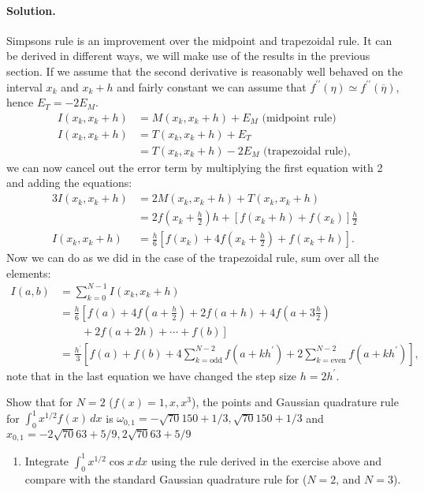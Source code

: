 \documentclass[graybox,sectrefs,envcountresetchap,open=right,final]{svmonodo}
\newenvironment{doconceexercise}{}{}
\begin{document}
\begin{doconceexercise}
\paragraph{Solution.}
Simpsons rule is an improvement over the midpoint and trapezoidal rule. It can be derived in different ways, we will make use of 
the results in the previous section. If we assume that the second derivative is reasonably well behaved on the interval $x_k$ 
and $x_k+h$ and fairly constant we can assume that $f^{\prime\prime}(\eta)\simeq f^{\prime\prime}(\overline{\eta})$, hence $E_T=-2E_M$.
\begin{align}
I(x_k,x_k+h)&=M(x_k,x_k+h)+E_M\text{ (midpoint rule)}\\ 
I(x_k,x_k+h)&=T(x_k,x_k+h)+E_T\nonumber\\ 
&=T(x_k,x_k+h)-2E_M\text{ (trapezoidal rule)},
\end{align}
we can now cancel out the error term by multiplying the first equation with 2 and adding the equations:
\begin{align}
3I(x_k,x_k+h)&=2M(x_k,x_k+h)+T(x_k,x_k+h)\\ 
&=2f(x_k+\frac{h}{2}) h+\left[f(x_k+h)+f(x_k)\right] \frac{h}{2}\\ 
I(x_k,x_k+h)&=\frac{h}{6}\left[f(x_k)+4f(x_k+\frac{h}{2})+f(x_k+h)\right].
\end{align}
Now we can do as we did in the case of the trapezoidal rule, sum over all the elements:
\begin{align}
I(a,b)&=\sum_{k=0}^{N-1}I(x_k,x_k+h)\nonumber\\ 
&=\frac{h}{6}\left[f(a)+ 4f(a+\frac{h}{2})+2f(a+h)+4f(a+3\frac{h}{2})\right.\nonumber\\ 
&\left.\qquad+2f(a+2h)+\cdots+f(b)\right]\\ 
&=\frac{h^\prime}{3}\left[f(a)+ f(b) + 4\sum_{k= \text{odd}}^{N-2}f(a+k h^\prime)+2\sum_{k= \text{even}}^{N-2}f(a+k h^\prime)\right],
\end{align}
note that in the last equation we have changed the step size $h=2h^\prime$.



Show that for $N=2$ ($f(x)=1,x,x^3$), the points and Gaussian quadrature rule for $\int_{0}^{1}x^{1/2}f(x)\,dx$
is $\omega_{0,1}=-\sqrt{70}{150} + 1/3, \sqrt{70}{150} + 1/3$
and $x_{0,1}=-2\sqrt{70}{63} + 5/9, 2\sqrt{70}{63} + 5/9$
\begin{enumerate}
\item Integrate $\int_0^1x^{1/2}\cos x\,dx$ using the rule derived in the exercise above and compare with the standard Gaussian quadrature rule for ($N=2$, and $N=3$).
\end{enumerate}


\end{doconceexercise}
\end{document}
